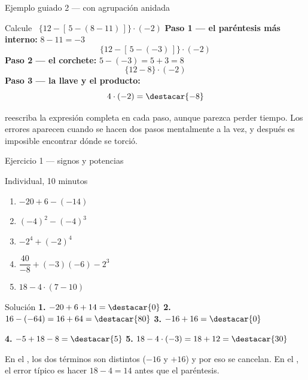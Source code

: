 \documentclass[aspectratio=169,10pt]{beamer}
\begin{document}
	\begin{frame}{Ejemplo guiado 2 — con agrupación anidada}
		\scriptsize
		\begin{exampleblock}{Calcule \ $\big\{12 - [\,5 - (8-11)\,]\big\}\cdot(-2)$}
			\tiny
			\textbf{Paso 1 — el paréntesis más interno:} \quad $8-11 = -3$
			\[ \big\{12 - [\,5 - (-3)\,]\big\}\cdot(-2) \]
			\textbf{Paso 2 — el corchete:} \quad $5-(-3) = 5+3 = 8$
			\[ \{12 - 8\}\cdot(-2) \]
			\textbf{Paso 3 — la llave y el producto:}
			\[ 4\cdot(-2) = \destacar{-8} \]
		\end{exampleblock}
		
		\vspace{0.08cm}
		{\tiny\color{uniGris}  reescriba la expresión
			completa en cada paso, aunque parezca perder tiempo. Los errores aparecen
			cuando se hacen dos pasos mentalmente a la vez, y después es imposible
			encontrar dónde se torció.}
	\end{frame}
	
	\begin{frame}{Ejercicio 1 — signos y potencias}
		\scriptsize
		\begin{alertblock}{Individual, 10 minutos}
			\tiny
			\begin{enumerate}\setlength{\itemsep}{-0.02cm}
				\item $-20 + 6 - (-14)$
				\item $(-4)^{2} - (-4)^{3}$
				\item $-2^{4} + (-2)^{4}$
				\item $\dfrac{40}{-8} + (-3)(-6) - 2^{3}$
				\item $18 - 4\cdot(7-10)$
			\end{enumerate}
		\end{alertblock}
		
		\vspace{0.06cm}
		\begin{block}{Solución}
			\tiny
			\textbf{1.} $-20+6+14 = \destacar{0}$ \qquad
			\textbf{2.} $16 - (-64) = 16+64 = \destacar{80}$ \qquad
			\textbf{3.} $-16 + 16 = \destacar{0}$
			
			\vspace{0.08cm}
			\textbf{4.} $-5 + 18 - 8 = \destacar{5}$ \qquad
			\textbf{5.} $18 - 4\cdot(-3) = 18+12 = \destacar{30}$
		\end{block}
		
		\vspace{0.05cm}
		{\tiny\color{uniGris} En el , los dos términos son distintos
			($-16$ y $+16$) y por eso se cancelan. En el , el error típico
			es hacer $18-4=14$ antes que el paréntesis.}
	\end{frame}
	
\end{document}
